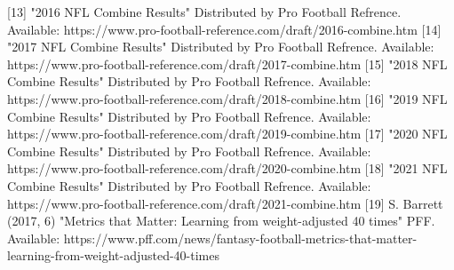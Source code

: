 \documentclass[confrence]{IEEEtran}
\begin{document}
[13] "2016 NFL Combine Results" Distributed by Pro Football Refrence. Available: https://www.pro-football-reference.com/draft/2016-combine.htm
[14] "2017 NFL Combine Results" Distributed by Pro Football Refrence. Available: https://www.pro-football-reference.com/draft/2017-combine.htm
[15] "2018 NFL Combine Results" Distributed by Pro Football Refrence. Available: https://www.pro-football-reference.com/draft/2018-combine.htm
[16] "2019 NFL Combine Results" Distributed by Pro Football Refrence. Available: https://www.pro-football-reference.com/draft/2019-combine.htm
[17] "2020 NFL Combine Results" Distributed by Pro Football Refrence. Available: https://www.pro-football-reference.com/draft/2020-combine.htm
[18] "2021 NFL Combine Results" Distributed by Pro Football Refrence. Available: https://www.pro-football-reference.com/draft/2021-combine.htm
[19] S. Barrett (2017, 6) "Metrics that Matter: Learning from weight-adjusted 40 times" PFF. Available: https://www.pff.com/news/fantasy-football-metrics-that-matter-learning-from-weight-adjusted-40-times
\end{document}
